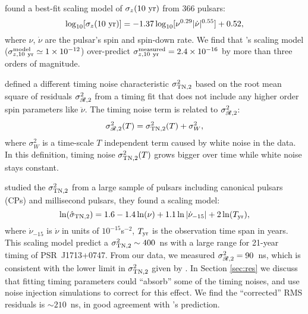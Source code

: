 {\bfref
\citet{hlk10} found a best-fit scaling model of $\sigma_z({\rm 10~yr})$ 
from 366 pulsars:
\begin{equation}
\label{eq:hlk10}
\log_{10}[\sigma_z({\rm 10~yr})] =
-1.37\log_{10}[\nu^{0.29}|\dot{\nu}|^{0.55}]+0.52,
\end{equation} 
where $\nu$, $\dot{\nu}$ are the pulsar's spin and spin-down rate.
We find that \citet{hlk10}'s scaling model ($\sigma^{\rm model}_{z, \rm
10~yr}\simeq1\times10^{-12}$) over-predict $\sigma^{\rm measured}_{z, \rm
10~yr}=2.4\times10^{-16}$ by more than three orders of magnitude. 

\citet{ch80} defined a different timing noise characteristic $\sigma^2_{\rm
TN,2}$ based on the root mean square of residuals $\sigma^2_{\mathscr{R},2}$ from a
timing fit that does not include any higher order spin parameters like
$\ddot{\nu}$. 
The timing noise term is related to $\sigma^2_{\mathscr{R},2}$:
\begin{equation}
\sigma^2_{\mathscr{R},2}(T) = \sigma^2_{\rm TN,2}(T) + \sigma^2_W, 
\end{equation}
where $\sigma^2_W$ is a time-scale $T$ independent term caused by white 
noise in the data.
In this definition, timing noise $\sigma^2_{\rm TN,2}(T)$ grows bigger over
time while white noise stays constant.  

\citet{sc10} studied the $\sigma^2_{\rm TN,2}$ from a large sample of pulsars
including canonical pulsars (CPs) and millisecond pulsars, they found a scaling
model:
\begin{equation}
\label{eq:sc10}
\ln(\hat{\sigma}_{\rm TN,2}) = 1.6 - 1.4\ln(\nu) +
1.1\ln|\dot{\nu}_{-15}|+2\ln(T_{\rm yr}),
\end{equation}
where $\dot{\nu}_{-15}$ is $\dot{\nu}$ in units of $10^{-15}$s$^{-2}$, $T_{\rm yr}$ is the 
observation time span in years.
This scaling model predict a $\sigma^2_{\rm TN,2}\sim400$~ns with a large
range for 21-year timing of PSR~J1713+0747. From our data, we measured
$\sigma^2_{\mathscr{R},2}=90$~ns, which is consistent with the lower limit in
$\sigma^2_{\rm TN,2}$ given by \citet{sc10}. In Section
\ref{sec:res} we discuss that  
fitting timing parameters could ``absorb'' some of the timing noises, and use
noise injection simulations to correct for this effect.
We find the ``corrected'' RMS residuals is $\sim210$~ns, in good agreement
with \citet{sc10}'s prediction.

}
